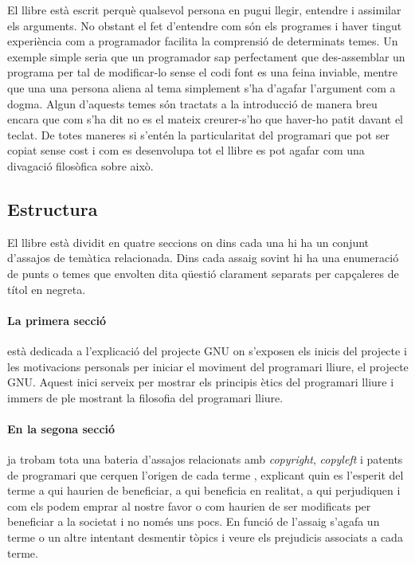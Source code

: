 \documentclass[a4paper,10pt]{scrartcl}
\begin{document}
  El llibre està escrit perquè qualsevol persona en pugui llegir, entendre i assimilar
els arguments. No obstant el fet d'entendre com són els programes i haver tingut
experiència com a programador facilita la comprensió de determinats temes. Un exemple
simple seria que un programador sap perfectament que des-assemblar un programa
per tal de modificar-lo sense el codi font es una feina inviable, mentre que 
una una persona aliena al tema simplement s'ha d'agafar l'argument com a dogma.
  Algun d'aquests temes són tractats a la introducció de manera breu encara
que com s'ha dit no es el mateix creurer-s'ho que haver-ho patit davant el teclat.
  De totes maneres si s'entén la particularitat del programari que pot ser copiat sense
cost i com es desenvolupa tot el llibre es pot agafar com una divagació filosòfica
sobre això.

  \subsection{Estructura}
  El llibre està dividit en quatre seccions on dins cada una hi ha un conjunt d'assajos
de temàtica relacionada. Dins cada assaig sovint hi ha una enumeració de punts o temes
que envolten dita qüestió clarament separats per capçaleres de títol en negreta.

\paragraph{La primera secció} està dedicada a l'explicació del projecte GNU on s'exposen
els inicis del projecte i les motivacions personals per iniciar el moviment del
programari lliure, el projecte GNU. Aquest inici serveix per mostrar
els principis ètics del programari lliure i immers de ple mostrant la
filosofia del programari lliure.

\paragraph{En la segona secció} ja trobam tota una bateria d'assajos relacionats amb
\emph{copyright}, \emph{copyleft} i patents de programari que cerquen l'origen de cada terme
, explicant quin es l'esperit del terme a qui haurien de beneficiar, a qui
beneficia en realitat, a qui perjudiquen i com els podem emprar
al nostre favor o com haurien de ser modificats per beneficiar a la
societat i no només uns pocs. En funció de l'assaig s'agafa un terme o un altre
intentant desmentir tòpics i veure els prejudicis associats a cada terme.
\end{document}
